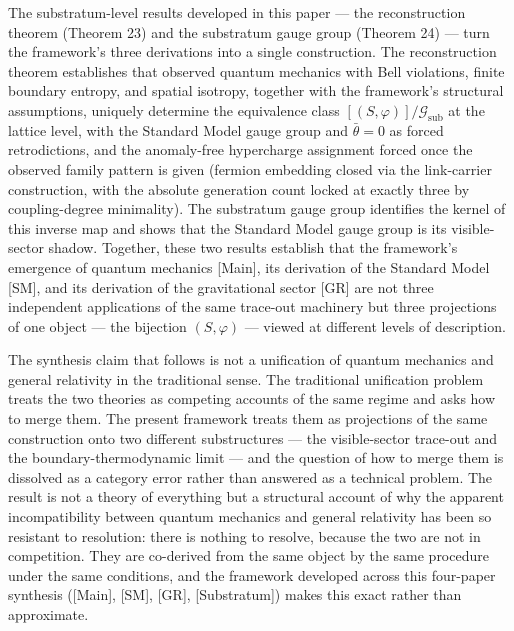 \documentclass[
]{article}
\begin{document}
The substratum-level results developed in this paper --- the
reconstruction theorem (Theorem 23) and the substratum gauge group
(Theorem 24) --- turn the framework's three derivations into a single
construction. The reconstruction theorem establishes that observed
quantum mechanics with Bell violations, finite boundary entropy, and
spatial isotropy, together with the framework's structural assumptions,
uniquely determine the equivalence class
\([(S, \varphi)]/\mathcal{G}_{\text{sub}}\) at the lattice level, with
the Standard Model gauge group and \(\bar\theta = 0\) as forced
retrodictions, and the anomaly-free hypercharge assignment forced once
the observed family pattern is given (fermion embedding closed via the
link-carrier construction, with the absolute generation count locked at
exactly three by coupling-degree minimality). The substratum gauge group
identifies the kernel of this inverse map and shows that the Standard
Model gauge group is its visible-sector shadow. Together, these two
results establish that the framework's emergence of quantum mechanics
{[}Main{]}, its derivation of the Standard Model {[}SM{]}, and its
derivation of the gravitational sector {[}GR{]} are not three
independent applications of the same trace-out machinery but three
projections of one object --- the bijection \((S, \varphi)\) --- viewed
at different levels of description.

The synthesis claim that follows is not a unification of quantum
mechanics and general relativity in the traditional sense. The
traditional unification problem treats the two theories as competing
accounts of the same regime and asks how to merge them. The present
framework treats them as projections of the same construction onto two
different substructures --- the visible-sector trace-out and the
boundary-thermodynamic limit --- and the question of how to merge them
is dissolved as a category error rather than answered as a technical
problem. The result is not a theory of everything but a structural
account of why the apparent incompatibility between quantum mechanics
and general relativity has been so resistant to resolution: there is
nothing to resolve, because the two are not in competition. They are
co-derived from the same object by the same procedure under the same
conditions, and the framework developed across this four-paper synthesis
({[}Main{]}, {[}SM{]}, {[}GR{]}, {[}Substratum{]}) makes this exact
rather than approximate.
\end{document}
